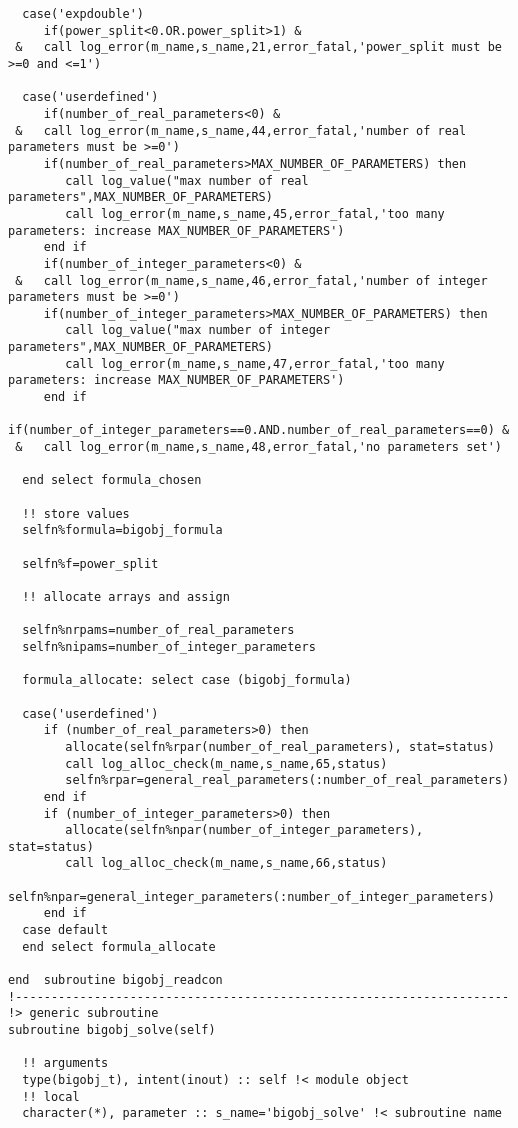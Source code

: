 \begin{verbatim}
  case('expdouble')
     if(power_split<0.OR.power_split>1) &
 &   call log_error(m_name,s_name,21,error_fatal,'power_split must be >=0 and <=1')

  case('userdefined')
     if(number_of_real_parameters<0) &
 &   call log_error(m_name,s_name,44,error_fatal,'number of real parameters must be >=0')
     if(number_of_real_parameters>MAX_NUMBER_OF_PARAMETERS) then
        call log_value("max number of real parameters",MAX_NUMBER_OF_PARAMETERS)
        call log_error(m_name,s_name,45,error_fatal,'too many parameters: increase MAX_NUMBER_OF_PARAMETERS')
     end if
     if(number_of_integer_parameters<0) &
 &   call log_error(m_name,s_name,46,error_fatal,'number of integer parameters must be >=0')
     if(number_of_integer_parameters>MAX_NUMBER_OF_PARAMETERS) then
        call log_value("max number of integer parameters",MAX_NUMBER_OF_PARAMETERS)
        call log_error(m_name,s_name,47,error_fatal,'too many parameters: increase MAX_NUMBER_OF_PARAMETERS')
     end if
     if(number_of_integer_parameters==0.AND.number_of_real_parameters==0) &
 &   call log_error(m_name,s_name,48,error_fatal,'no parameters set')

  end select formula_chosen

  !! store values
  selfn%formula=bigobj_formula

  selfn%f=power_split

  !! allocate arrays and assign

  selfn%nrpams=number_of_real_parameters
  selfn%nipams=number_of_integer_parameters

  formula_allocate: select case (bigobj_formula)

  case('userdefined')
     if (number_of_real_parameters>0) then
        allocate(selfn%rpar(number_of_real_parameters), stat=status)
        call log_alloc_check(m_name,s_name,65,status)
        selfn%rpar=general_real_parameters(:number_of_real_parameters)
     end if
     if (number_of_integer_parameters>0) then
        allocate(selfn%npar(number_of_integer_parameters), stat=status)
        call log_alloc_check(m_name,s_name,66,status)
        selfn%npar=general_integer_parameters(:number_of_integer_parameters)
     end if
  case default
  end select formula_allocate

end  subroutine bigobj_readcon
!---------------------------------------------------------------------
!> generic subroutine
subroutine bigobj_solve(self)

  !! arguments
  type(bigobj_t), intent(inout) :: self !< module object
  !! local
  character(*), parameter :: s_name='bigobj_solve' !< subroutine name


\end{verbatim}
